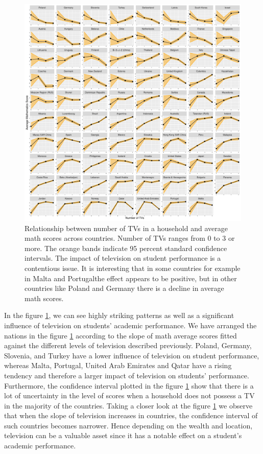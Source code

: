 \begin{Schunk}
\begin{figure}[H]
\includegraphics[width=1\linewidth]{learningtower_files/figure-latex/tv-plot-1} \caption[Relationship  between number of TVs in a household and average math scores across countries]{Relationship  between number of TVs in a household and average math scores across countries. Number of TVs ranges from 0 to 3 or more. The orange bands indicate 95 percent standard confidence intervals. The impact of television on student performance is a contentious issue. It is interesting that in some countries for example in Malta and Portugalthe effect appears to be positive, but in other countries like Poland and Germany there is a decline in average math scores.}\label{fig:tv-plot}
\end{figure}
\end{Schunk}

In the figure \ref{fig:tv-plot}, we can see highly striking patterns as
well as a significant influence of television on students' academic
performance. We have arranged the nations in the figure
\ref{fig:tv-plot} according to the slope of math average scores fitted
against the different levels of television described previously. Poland,
Germany, Slovenia, and Turkey have a lower influence of television on
student performance, whereas Malta, Portugal, United Arab Emirates and
Qatar have a rising tendency and therefore a larger impact of television
on students' performance. Furthermore, the confidence interval plotted
in the figure \ref{fig:tv-plot} show that there is a lot of uncertainty
in the level of scores when a household does not possess a TV in the
majority of the countries. Taking a closer look at the figure
\ref{fig:tv-plot} we observe that when the slope of television increases
in countries, the confidence interval of such countries becomes
narrower. Hence depending on the wealth and location, television can be
a valuable asset since it has a notable effect on a student's academic
performance.

